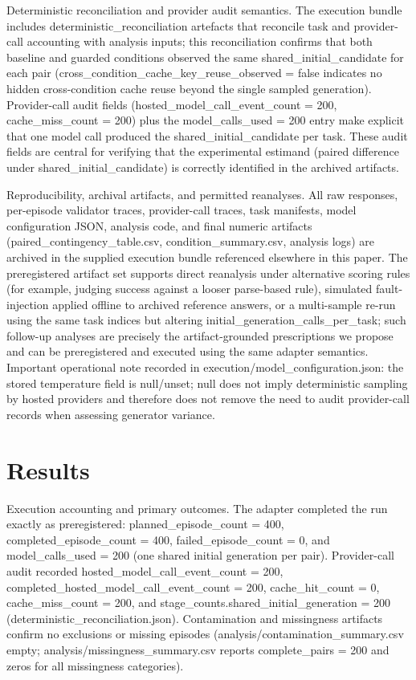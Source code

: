 \documentclass[conference]{IEEEtran}
\begin{document}
Deterministic reconciliation and provider audit semantics. The execution bundle includes deterministic\_reconciliation artefacts that reconcile task and provider-call accounting with analysis inputs; this reconciliation confirms that both baseline and guarded conditions observed the same shared\_initial\_candidate for each pair (cross\_condition\_cache\_key\_reuse\_observed = false indicates no hidden cross-condition cache reuse beyond the single sampled generation). Provider-call audit fields (hosted\_model\_call\_event\_count = 200, cache\_miss\_count = 200) plus the model\_calls\_used = 200 entry make explicit that one model call produced the shared\_initial\_candidate per task. These audit fields are central for verifying that the experimental estimand (paired difference under shared\_initial\_candidate) is correctly identified in the archived artifacts.

Reproducibility, archival artifacts, and permitted reanalyses. All raw responses, per-episode validator traces, provider-call traces, task manifests, model configuration JSON, analysis code, and final numeric artifacts (paired\_contingency\_table.csv, condition\_summary.csv, analysis logs) are archived in the supplied execution bundle referenced elsewhere in this paper. The preregistered artifact set supports direct reanalysis under alternative scoring rules (for example, judging success against a looser parse-based rule), simulated fault-injection applied offline to archived reference answers, or a multi-sample re-run using the same task indices but altering initial\_generation\_calls\_per\_task; such follow-up analyses are precisely the artifact-grounded prescriptions we propose and can be preregistered and executed using the same adapter semantics. Important operational note recorded in execution/model\_configuration.json: the stored temperature field is null/unset; null does not imply deterministic sampling by hosted providers and therefore does not remove the need to audit provider-call records when assessing generator variance.

\section{Results}
Execution accounting and primary outcomes. The adapter completed the run exactly as preregistered: planned\_episode\_count = 400, completed\_episode\_count = 400, failed\_episode\_count = 0, and model\_calls\_used = 200 (one shared initial generation per pair). Provider-call audit recorded hosted\_model\_call\_event\_count = 200, completed\_hosted\_model\_call\_event\_count = 200, cache\_hit\_count = 0, cache\_miss\_count = 200, and stage\_counts.shared\_initial\_generation = 200 (deterministic\_reconciliation.json). Contamination and missingness artifacts confirm no exclusions or missing episodes (analysis/contamination\_summary.csv empty; analysis/missingness\_summary.csv reports complete\_pairs = 200 and zeros for all missingness categories).
\end{document}
